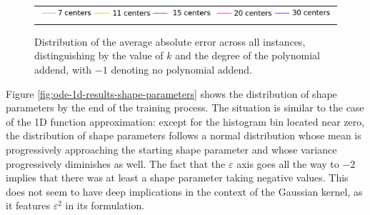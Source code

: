 \documentclass[12pt]{report} %
\begin{document}
\begin{figure}
\begin{tabular}{cc}
    \multicolumn{2}{c}{{\includegraphics[width=.9\textwidth]{imagenes/experiments/1d/ode/ode_legend.png}}} 
   \end{tabular}
   \caption{Distribution of the average absolute error across all instances, distinguishing by the value of $k$ and the degree of the polynomial addend, with $-1$ denoting no polynomial addend.}
   \label{ode-1d-results-average-error}
\end{figure}




Figure \ref{fig:ode-1d-results-shape-parameters} shows the distribution of shape parameters by the end of the training process. The situation is similar to the case of the 1D function approximation: except for the histogram bin located near zero, the distribution of shape parameters follows a normal distribution whose mean is progressively approaching the starting shape parameter and whose variance progressively diminishes as well. The fact that the $\varepsilon$ axis goes all the way to $-2$ implies that there was at least a shape parameter taking negative values. This does not seem to have deep implications in the context of the Gaussian kernel, as it features $\varepsilon^2$ in its formulation.
\end{document}
